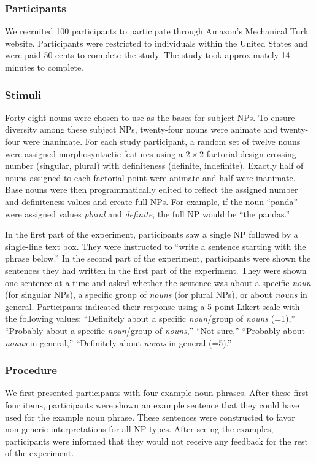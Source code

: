 \documentclass[10pt,letterpaper]{article}
\begin{document}
\subsubsection{Participants} \quad We recruited 100 participants to participate through Amazon's Mechanical Turk website. Participants were restricted to individuals within the United States and were paid 50 cents to complete the study. The study took approximately 14 minutes to complete.

\subsubsection{Stimuli} \quad Forty-eight nouns were chosen to use as the bases for subject NPs. To ensure diversity among these subject NPs, twenty-four nouns were animate and twenty-four were inanimate. For each study participant, a random set of twelve nouns were assigned morphosyntactic features using a \(2 \times 2\) factorial design crossing number (singular, plural) with definiteness (definite, indefinite). Exactly half of nouns assigned to each factorial point were animate and half were inanimate. Base nouns were then programmatically edited to reflect the assigned number and definiteness values and create full NPs. For example, if the noun ``panda'' were assigned values \textit{plural} and \textit{definite}, the full NP would be ``the pandas.''

In the first part of the experiment, participants saw a single NP followed by a single-line text box. They were instructed to ``write a sentence starting with the phrase below.'' In the second part of the experiment, participants were shown the sentences they had written in the first part of the experiment. They were shown one sentence at a time and asked whether the sentence was about a specific \textit{noun} (for singular NPs), a specific group of \textit{nouns} (for plural NPs), or about \textit{nouns} in general. Participants indicated their response using a 5-point Likert scale with the following values: ``Definitely about a specific \textit{noun}/group of \textit{nouns} (=1),'' ``Probably about a specific \textit{noun}/group of \textit{nouns},'' ``Not sure,'' ``Probably about \textit{nouns} in general,'' ``Definitely about \textit{nouns} in general (=5).''

\subsubsection{Procedure} \quad We first presented participants with four example noun phrases. After these first four items, participants were shown an example sentence that they could have used for the example noun phrase. These sentences were constructed to favor non-generic interpretations for all NP types. After seeing the examples, participants were informed that they would not receive any feedback for the rest of the experiment.
\end{document}
